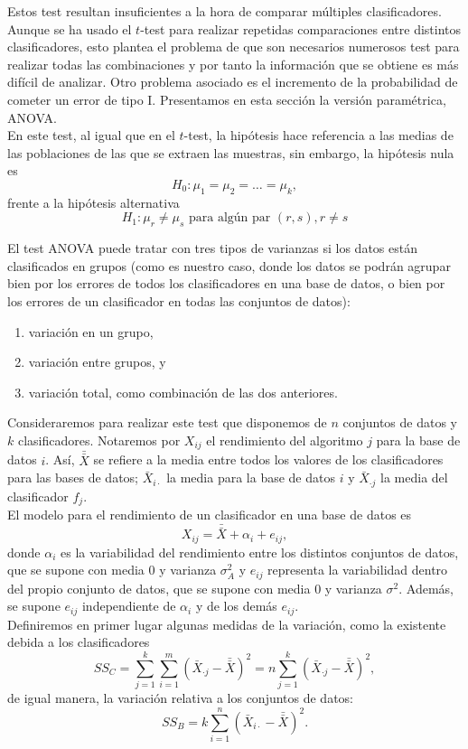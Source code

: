 	Estos test resultan insuficientes a la hora de comparar 
múltiples clasificadores. Aunque se ha usado el $t$-test para 
realizar repetidas comparaciones entre distintos 
clasificadores, esto plantea el problema de que son 
necesarios numerosos test para realizar todas las 
combinaciones y por tanto la información que se obtiene es
más difícil de analizar. Otro problema asociado es el 
incremento de la probabilidad de cometer un error de tipo I. 
Presentamos en esta sección la versión paramétrica, ANOVA.\\
	En este test, al igual que en el $t$-test, la hipótesis 
hace referencia a las medias de las poblaciones de las que 
se extraen las muestras, sin embargo, la hipótesis nula es
	\[
		H_0 : \mu_1 = \mu_2 = \dots = \mu_k,
	\]
	frente a la hipótesis alternativa
	\[
		H_1 : \mu_r \neq \mu_s \text{ para algún par }
			(r, s), r \neq s 
	\]
	
	El test ANOVA puede tratar con tres tipos de varianzas
si los datos están clasificados en grupos (como es nuestro
caso, donde los datos se podrán agrupar bien por los errores
de todos los clasificadores en una base de datos, o bien por
los errores de un clasificador en todas las conjuntos de datos):
	\begin{enumerate}
	\item variación en un grupo,
	\item variación entre grupos, y
	\item variación total, como combinación de las 
		dos anteriores.
	\end{enumerate}

	Consideraremos para realizar este test que disponemos de 
$n$ conjuntos de datos y $k$ clasificadores. Notaremos por 
$X_{ij}$ el rendimiento del algoritmo $j$ para la base de 
datos $i$. Así, $\bar{\bar{X}}$ se refiere a la media entre 
todos los valores de los clasificadores para las bases de
datos; $\bar{X}_{i \cdot}$ la media para la base de datos $i$ 
y $\bar{X}_{\cdot j}$ la media del clasificador $f_j$.\\
	El modelo para el rendimiento de un clasificador en una 
base de datos es
	\[
		X_{ij} = \bar{\bar{X}} + \alpha_i + e_{ij},
	\]
	donde $\alpha_i$ es la variabilidad del rendimiento entre 
los distintos conjuntos de datos, que se supone con media 0 y
varianza $\sigma_A^2$ y $e_{ij}$ representa la variabilidad
dentro del propio conjunto de datos, que se supone con media 
0 y varianza $\sigma^2$. Además, se supone $e_{ij}$ 
independiente de $\alpha_i$ y de los demás $e_{ij}$.\\
	Definiremos en primer lugar algunas medidas de la 
variación, como la existente debida a los clasificadores
	\[ 
		SS_C = \sum\limits_{j=1}^k
				 \sum\limits_{i=1}^m
					\left( \bar{X}_{\cdot j} - 
						   \bar{\bar{X}} \right)^2 =
				n \sum\limits_{j=1}^k
					\left( \bar{X}_{\cdot j} - 
					  	   \bar{\bar{X}} \right)^2,
	\]
	de igual manera, la variación relativa a los conjuntos de
datos:
	\[ 
		SS_B = k \sum\limits_{i=1}^n
					\left( \bar{X}_{i \cdot} - 
					  	   \bar{\bar{X}} \right)^2.
	\]
	
